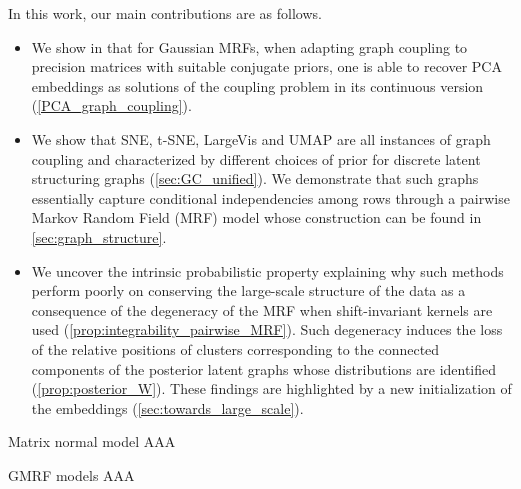 In this work, our main contributions are as follows.

\begin{itemize}
    \item We show in  that for Gaussian MRFs, when adapting graph coupling to precision matrices with suitable conjugate priors, one is able to recover PCA embeddings as solutions of the coupling problem in its continuous version (\cref{PCA_graph_coupling}).
    \item We show that SNE, t-SNE, LargeVis and UMAP are all instances of graph coupling and characterized by different choices of prior for discrete latent structuring graphs (\cref{sec:GC_unified}). We demonstrate that such graphs essentially capture conditional independencies among rows through a pairwise Markov Random Field (MRF) model whose construction can be found in \cref{sec:graph_structure}.
    \item We uncover the intrinsic probabilistic property explaining why such methods perform poorly on conserving the large-scale structure of the data as a consequence of the degeneracy of the MRF when shift-invariant kernels are used (\cref{prop:integrability_pairwise_MRF}). Such degeneracy induces the loss of the relative positions of clusters corresponding to the connected components of the posterior latent graphs whose distributions are identified (\cref{prop:posterior_W}). These findings are highlighted by a new initialization of the embeddings (\cref{sec:towards_large_scale}).
\end{itemize}


\begin{mem1}{Matrix normal model}\label{memo:matrix_normal}
    AAA
\end{mem1}

\begin{mem1}{GMRF models}
    AAA
\end{mem1}